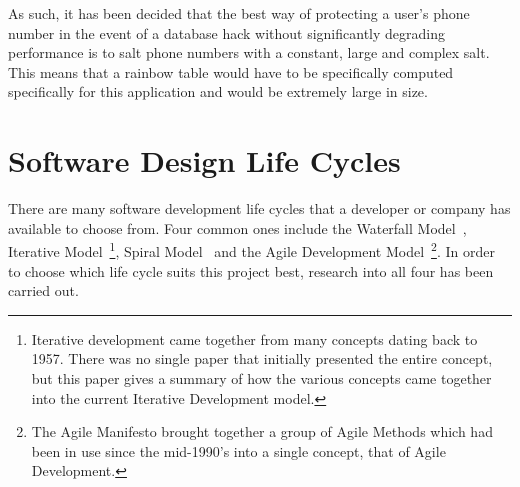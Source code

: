 \documentclass[authoryearcitations]{UoYCSproject}
\begin{document}
As such, it has been decided that the best way of protecting a user's phone number in the event of a database hack without significantly degrading performance is to salt phone numbers with a constant, large and complex salt. This means that a rainbow table would have to be specifically computed specifically for this application and would be extremely large in size.

\section{Software Design Life Cycles}
There are many software development life cycles that a developer or company has available to choose from.  Four common ones include the Waterfall Model~\cite{royce1970managing-FirstDescriptionOfWaterFallModelNotByName}, Iterative Model~\cite{briefHistoryOfIncrementalAndIterativeSoftwareDevelopment}\footnote{Iterative development came together from many concepts dating back to 1957.  There was no single paper that initially presented the entire concept, but this paper gives a summary of how the various concepts came together into the current Iterative Development model.}, Spiral Model~\cite{spiralModelSoftwareDevelopment} and the Agile Development Model~\cite{beck2001agile}\footnote{The Agile Manifesto brought together a group of Agile Methods which had been in use since the mid-1990's into a single concept, that of Agile Development.}. In order to choose which life cycle suits this project best, research into all four has been carried out.

\end{document}

